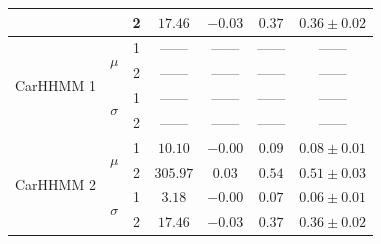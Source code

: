 \begin{table}
{\begin{tabular}{ccccccc}
                           &                               & 2                             & $17.46$                         & $-0.03$                     & $0.37$                             & $0.36 \pm 0.02$                             \\ \hline
\multirow{4}{*}{CarHHMM 1} & \multirow{2}{*}{$\mu$}        & 1                             & ------                         & ------                     & ------                             & ------                                      \\
                           &                               & 2                             & ------                         & ------                     & ------                             & ------                                      \\
                           & \multirow{2}{*}{$\sigma$}     & 1                             & ------                         & ------                     & ------                             & ------                                      \\
                           &                               & 2                             & ------                         & ------                     & ------                             & ------                                      \\ \hline
\multirow{4}{*}{CarHHMM 2} & \multirow{2}{*}{$\mu$}        & 1                             & $10.10$                         & $-0.00$                     & $0.09$                             & $0.08 \pm 0.01$                             \\
                           &                               & 2                             & $305.97$                         & $0.03$                     & $0.54$                             & $0.51 \pm 0.03$                             \\
                           & \multirow{2}{*}{$\sigma$}     & 1                             & $3.18$                         & $-0.00$                     & $0.07$                             & $0.06 \pm 0.01$                             \\
                           &                               & 2                             & $17.46$                         & $-0.03$                     & $0.37$                             & $0.36 \pm 0.02$                             
\end{tabular}
}
\label{table:FoVeDBA}
\end{table}

